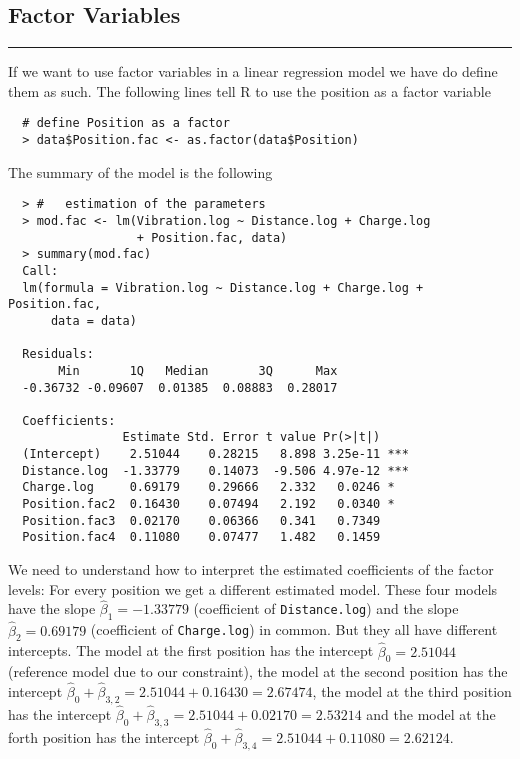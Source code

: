 \subsection{Factor Variables}
\noindent\rule[\linienAbstand]{\linewidth}{\linienDicke}
If we want to use factor variables in a linear regression model we have do define them as such. The following lines tell R to use the position as a factor variable
\begingroup
\scriptsize
\begin{verbatim}
  # define Position as a factor
  > data$Position.fac <- as.factor(data$Position)
\end{verbatim}
\endgroup

The summary of the model is the following
\begingroup
\scriptsize
\begin{verbatim}
  > #   estimation of the parameters
  > mod.fac <- lm(Vibration.log ~ Distance.log + Charge.log
                  + Position.fac, data)
  > summary(mod.fac)
  Call:
  lm(formula = Vibration.log ~ Distance.log + Charge.log + Position.fac,
      data = data)

  Residuals:
       Min       1Q   Median       3Q      Max
  -0.36732 -0.09607  0.01385  0.08883  0.28017

  Coefficients:
                Estimate Std. Error t value Pr(>|t|)
  (Intercept)    2.51044    0.28215   8.898 3.25e-11 ***
  Distance.log  -1.33779    0.14073  -9.506 4.97e-12 ***
  Charge.log     0.69179    0.29666   2.332   0.0246 *
  Position.fac2  0.16430    0.07494   2.192   0.0340 *
  Position.fac3  0.02170    0.06366   0.341   0.7349
  Position.fac4  0.11080    0.07477   1.482   0.1459

\end{verbatim}
\endgroup

We need to understand how to interpret the estimated coefficients of the factor levels:
For every position we get a different estimated model. These four models have the slope $\hat{\beta}_1 = -1.33779$ (coefficient of \texttt{Distance.log}) and the slope $\hat{\beta}_2 = 0.69179$ (coefficient of \texttt{Charge.log}) in common.
But they all have different intercepts. The model at the first position has the intercept $\hat{\beta}_0 = 2.51044$ (reference model due to our constraint), the model at the second position has the intercept $\hat{\beta}_0 + \hat{\beta}_{3,2} = 2.51044 + 0.16430 = 2.67474$, the model at the third position has the intercept $\hat{\beta}_0 + \hat{\beta}_{3,3} = 2.51044 + 0.02170 = 2.53214$ and the model at the forth position has the intercept $\hat{\beta}_0 + \hat{\beta}_{3,4} = 2.51044 + 0.11080 = 2.62124$.\\

